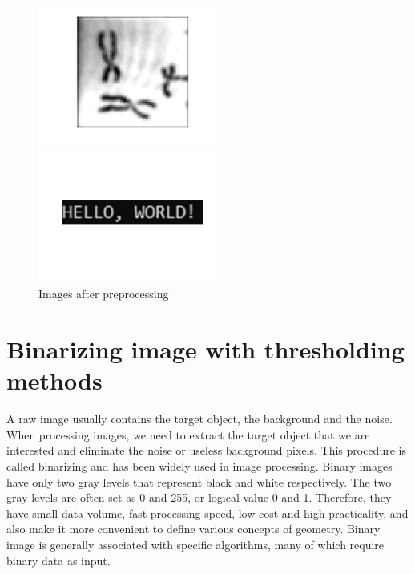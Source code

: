 \documentclass[hyperref]{article}
\theoremstyle{nonumberplain}
\begin{document}
	\begin{figure}[htbp]
		\centering
		\begin{minipage}[t]{0.48\textwidth}
			\centering
			\includegraphics[width=6cm]{fig3a.jpg}
		\end{minipage}
		\begin{minipage}[t]{0.48\textwidth}
			\centering
			\includegraphics[width=6cm]{fig3b.jpg}
		\end{minipage}
		\caption{Images after preprocessing}
		\label{fig3}
	\end{figure}
	
	
	
	\section{Binarizing image with thresholding methods}
	
	\hspace{1.0em}
	A raw image usually contains the target object, the background and the noise. When processing images, we need to extract the target object that we are interested and eliminate the noise or useless background pixels. This procedure is called binarizing and has been widely used in image processing. Binary images have only two gray levels that represent black and white respectively. The two gray levels are often set as 0 and 255, or logical value 0 and 1. Therefore, they have small data volume, fast processing speed, low cost and high practicality, and also make it more convenient to define various concepts of geometry. Binary image is generally associated with specific algorithms, many of which require binary data as input.
	
\end{document}
